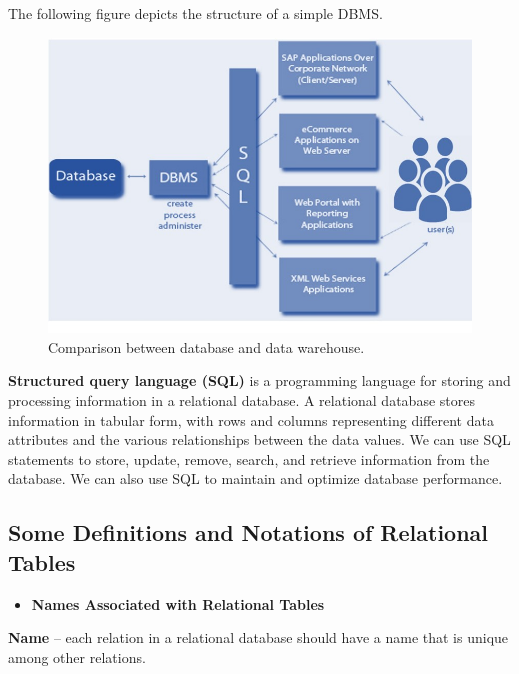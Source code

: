 \documentclass[
]{book}
\providecommand{\tightlist}{%
  \setlength{\itemsep}{0pt}\setlength{\parskip}{0pt}}
\begin{document}
The following figure depicts the structure of a simple DBMS.

\begin{figure}

{\centering \includegraphics[width=0.99\linewidth]{img01/w01-DBNS-sturcture} 

}

\caption{Comparison between database and data warehouse.}\label{fig:unnamed-chunk-11}
\end{figure}

\textbf{Structured query language (SQL)} is a programming language for storing and processing information in a relational database. A relational database stores information in tabular form, with rows and columns representing different data attributes and the various relationships between the data values. We can use SQL statements to store, update, remove, search, and retrieve information from the database. We can also use SQL to maintain and optimize database performance.

\hypertarget{some-definitions-and-notations-of-relational-tables}{%
\subsection{Some Definitions and Notations of Relational Tables}\label{some-definitions-and-notations-of-relational-tables}}

\begin{itemize}
\tightlist
\item
  \textbf{Names Associated with Relational Tables}
\end{itemize}

\textbf{Name} -- each relation in a relational database should have a name that is unique among other relations.
\end{document}
